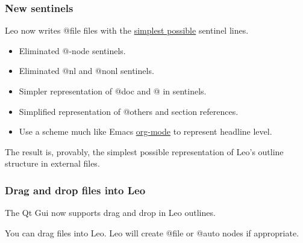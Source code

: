 \documentclass[a4paper,10pt,english]{sphinxmanual}
\begin{document}
\subsubsection{New sentinels}
\label{what-is-new:new-sentinels}
Leo now writes @file files with the \href{http://groups.google.com/group/leo-editor/browse\_thread/thread/8b659c96720afd53/628a09779ca9e8c6}{simplest possible} sentinel lines.
\begin{itemize}
\item {} 
Eliminated @-node sentinels.

\item {} 
Eliminated @nl and @nonl sentinels.

\item {} 
Simpler representation of @doc and @ in sentinels.

\item {} 
Simplified representation of @others and section references.

\item {} 
Use a scheme much like Emacs \href{http://orgmode.org/}{org-mode} to represent headline level.

\end{itemize}

The result is, provably, the simplest possible representation of Leo's outline
structure in external files.


\subsubsection{Drag and drop files into Leo}
\label{what-is-new:drag-and-drop-files-into-leo}
The Qt Gui now supports drag and drop in Leo outlines.

You can drag files into Leo.  Leo will create @file or @auto nodes if appropriate.
\end{document}
